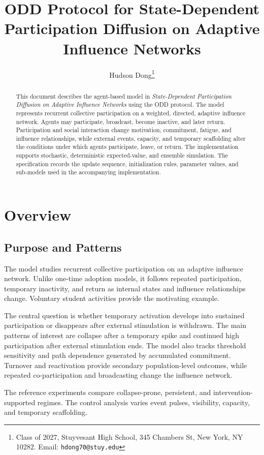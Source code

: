 \documentclass[11pt]{article}
\title{\textbf{ODD Protocol for State-Dependent Participation Diffusion on Adaptive Influence Networks}}
\author{Hudson Dong\thanks{Class of 2027, Stuyvesant High School, 345 Chambers St, New York, NY 10282. Email: \texttt{hdong70@stuy.edu}}}
\date{}
\begin{document}
\maketitle
\begin{abstract}
This document describes the agent-based model in \textit{State-Dependent Participation Diffusion on Adaptive Influence Networks} using the ODD protocol. The model represents recurrent collective participation on a weighted, directed, adaptive influence network. Agents may participate, broadcast, become inactive, and later return. Participation and social interaction change motivation, commitment, fatigue, and influence relationships, while external events, capacity, and temporary scaffolding alter the conditions under which agents participate, leave, or return. The implementation supports stochastic, deterministic expected-value, and ensemble simulation. The specification records the update sequence, initialization rules, parameter values, and sub-models used in the accompanying implementation. 
\end{abstract}

\section{Overview}
\subsection{Purpose and Patterns}
The model studies recurrent collective participation on an adaptive influence network. Unlike one-time adoption models, it follows repeated participation, temporary inactivity, and return as internal states and influence relationships change. Voluntary student activities provide the motivating example.

The central question is whether temporary activation develops into sustained participation or disappears after external stimulation is withdrawn. The main patterns of interest are collapse after a temporary spike and continued high participation after external stimulation ends. The model also tracks threshold sensitivity and path dependence generated by accumulated commitment. Turnover and reactivation provide secondary population-level outcomes, while repeated co-participation and broadcasting change the influence network.

The reference experiments compare collapse-prone, persistent, and intervention-supported regimes. The control analysis varies event pulses, visibility, capacity, and temporary scaffolding.
\end{document}
